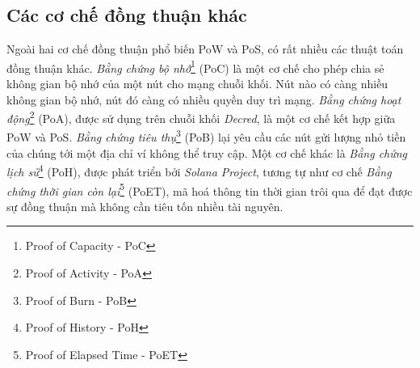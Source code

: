 \subsection{Các cơ chế đồng thuận khác}

Ngoài hai cơ chế đồng thuận phổ biến PoW và PoS, có rất nhiều các thuật toán đồng thuận khác. \textit{Bằng chứng bộ nhớ}\footnote{Proof of Capacity - PoC} (PoC) là một cơ chế cho phép chia sẻ không gian bộ nhớ của một nút cho mạng chuỗi khối. Nút nào có càng nhiều không gian bộ nhớ, nút đó càng có nhiều quyền duy trì mạng. \textit{Bằng chứng hoạt động}\footnote{Proof of Activity - PoA} (PoA), được sử dụng trên chuỗi khối \textit{Decred}, là một cơ chế kết hợp giữa PoW và PoS. \textit{Bằng chứng tiêu thụ}\footnote{Proof of Burn - PoB} (PoB) lại yêu cầu các nút gửi lượng nhỏ tiền của chúng tới một địa chỉ ví không thể truy cập. Một cơ chế khác là \textit{Bằng chứng lịch sử}\footnote{Proof of History - PoH} (PoH), được phát triển bởi \textit{Solana Project}, tương tự như cơ chế \textit{Bằng chứng thời gian còn lại}\footnote{Proof of Elapsed Time - PoET} (PoET), mã hoá thông tin thời gian trôi qua để đạt được sự đồng thuận mà không cần tiêu tốn nhiều tài nguyên.